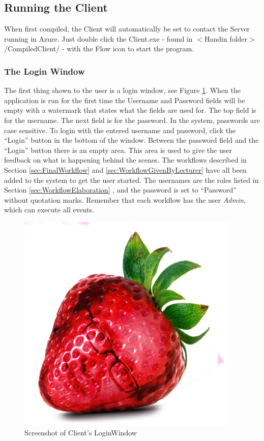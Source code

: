 \subsection{Running the Client}
When first compiled, the Client will automatically be set to contact the Server running in Azure. Just double click the Client.exe - found in $<$Handin folder$>$/CompiledClient/ -  with the Flow icon to start the program.

\subsubsection{The Login Window}
The first thing shown to the user is a login window, see Figure \ref{fig:LoginWindow}. When the application is run for the first time the Username and Password fields will be empty with a watermark that states what the fields are used for. \newline
The top field is for the username. The next field is for the password. In the system, passwords are case sensitive. \newline
To login with the entered username and password, click the “Login” button in the bottom of the window. \newline
Between the password field and the “Login” button there is an empty area. This area is used to give the user feedback on what is happening behind the scenes. \newline
The workflows described in Section \ref{sec:FinalWorkflow}  and \ref{sec:WorkflowGivenByLecturer}  have all been added to the system to get the user started. The usernames are the roles listed in Section \ref{sec:WorkflowElaboration} , and the password is set to “Password” without quotation marks. Remember that each workflow has the user \textit{Admin}, which can execute all events.

\begin{figure}
\centering
\includegraphics[width=0.5\linewidth]{Figures/strawberry}
\caption{\label{fig:LoginWindow} Screenshot of Client's LoginWindow}
\end{figure}


